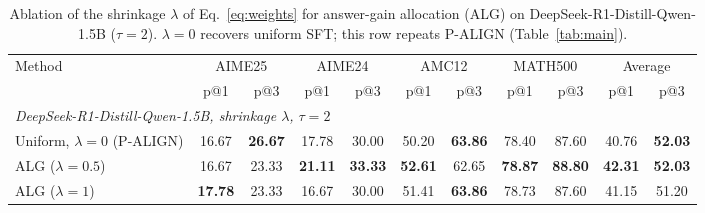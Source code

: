 \documentclass[11pt]{article}
\begin{document}
\begin{table}[t]
  \centering
  \small
  \setlength{\tabcolsep}{4pt}
  \begin{tabular}{p{4.3cm}cccccccccc}
    \toprule
    \multirow{2}{*}{Method}
    & \multicolumn{2}{c}{AIME25}
    & \multicolumn{2}{c}{AIME24}
    & \multicolumn{2}{c}{AMC12}
    & \multicolumn{2}{c}{MATH500}
    & \multicolumn{2}{c}{Average} \\
    \cmidrule(lr){2-3}
    \cmidrule(lr){4-5}
    \cmidrule(lr){6-7}
    \cmidrule(lr){8-9}
    \cmidrule(lr){10-11}
    & p@1 & p@3 & p@1 & p@3 & p@1 & p@3
    & p@1 & p@3 & p@1 & p@3 \\
    \midrule
    \multicolumn{11}{l}{\textit{DeepSeek-R1-Distill-Qwen-1.5B, shrinkage $\lambda$, $\tau=2$}} \\
    Uniform, $\lambda=0$ (P-ALIGN)
    & 16.67 & \textbf{26.67}
    & 17.78 & 30.00
    & 50.20 & \textbf{63.86}
    & 78.40 & 87.60
    & 40.76 & \textbf{52.03} \\
    ALG ($\lambda=0.5$)
    & 16.67 & 23.33
    & \textbf{21.11} & \textbf{33.33}
    & \textbf{52.61} & 62.65
    & \textbf{78.87} & \textbf{88.80}
    & \textbf{42.31} & \textbf{52.03} \\
    ALG ($\lambda=1$)
    & \textbf{17.78} & 23.33
    & 16.67 & 30.00
    & 51.41 & \textbf{63.86}
    & 78.73 & 87.60
    & 41.15 & 51.20 \\
    \bottomrule
  \end{tabular}
  \caption{Ablation of the shrinkage $\lambda$ of Eq.~\ref{eq:weights} for answer-gain allocation (ALG) on DeepSeek-R1-Distill-Qwen-1.5B ($\tau=2$). $\lambda=0$ recovers uniform SFT; this row repeats P-ALIGN (Table~\ref{tab:main}).}
  \label{tab:abl-lambda}
\end{table}
\end{document}

